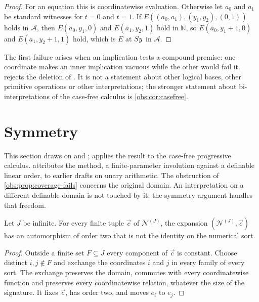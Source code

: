 \begin{proof}
For an equation this is coordinatewise evaluation. Otherwise let $a_0$ and
$a_1$ be standard witnesses for $t=0$ and $t=1$. If
$E((a_0,a_1),(y_1,y_2),(0,1))$ holds in $\mathcal{A}$, then $E(a_0,y_1,0)$ and
$E(a_1,y_2,1)$ hold in $\mathbb{N}$, so $E(a_0,y_1+1,0)$ and $E(a_1,y_2+1,1)$
hold, which is $E$ at $S y$ in $\mathcal{A}$.
\end{proof}

The first failure arises when an implication tests a compound premise: one
coordinate makes an inner implication vacuous while the other would fail it.
 rejects the deletion of . It is
not a statement about other logical bases, other primitive operations or other
interpretations; the stronger statement about bi-interpretations of the
case-free calculus is \cref{obs:cor:casefree}.

\section{Symmetry}
\label{obs:sec:symmetry}

This section draws on  and ;
 applies the result to the case-free progressive
calculus.  attributes the method, a finite-parameter involution
against a definable linear order, to earlier drafts on unary arithmetic. The
obstruction of \cref{obs:prop:coverage-fails} concerns the original domain. An
interpretation on a different definable domain is not touched by it; the
symmetry argument handles that freedom.

\begin{lemma}
\label{obs:lem:involution}
Let $J$ be infinite. For every finite tuple $\vec c$ of
$\mathcal{N}^{(J)}$, the expansion $(\mathcal{N}^{(J)},\vec c)$ has an
automorphism of order two that is not the identity on the numerical sort.
\end{lemma}

\begin{proof}
Outside a finite set $F\subseteq J$ every component of $\vec c$ is constant.
Choose distinct $i,j\notin F$ and exchange the coordinates $i$ and $j$ in every
family of every sort. The exchange preserves the domain, commutes with every
coordinatewise function and preserves every coordinatewise relation, whatever
the size of the signature. It fixes $\vec c$, has order two, and moves $e_i$ to
$e_j$.
\end{proof}

